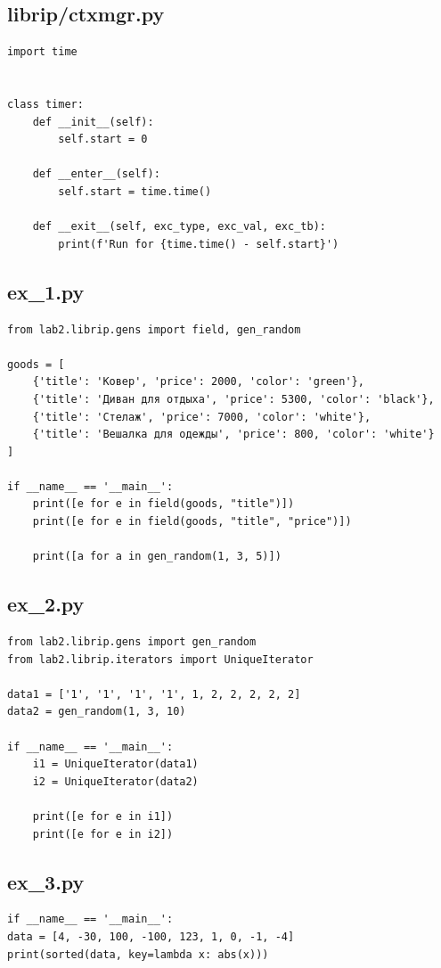 \documentclass{article}
\begin{document}
\subsection{librip/ctxmgr.py}
\begin{verbatim}
import time


class timer:
    def __init__(self):
        self.start = 0

    def __enter__(self):
        self.start = time.time()

    def __exit__(self, exc_type, exc_val, exc_tb):
        print(f'Run for {time.time() - self.start}')
\end{verbatim}

\subsection{ex\_1.py}
\begin{verbatim}
from lab2.librip.gens import field, gen_random

goods = [
    {'title': 'Ковер', 'price': 2000, 'color': 'green'},
    {'title': 'Диван для отдыха', 'price': 5300, 'color': 'black'},
    {'title': 'Стелаж', 'price': 7000, 'color': 'white'},
    {'title': 'Вешалка для одежды', 'price': 800, 'color': 'white'}
]

if __name__ == '__main__':
    print([e for e in field(goods, "title")])
    print([e for e in field(goods, "title", "price")])

    print([a for a in gen_random(1, 3, 5)])

\end{verbatim}
\subsection{ex\_2.py}
\begin{verbatim}
from lab2.librip.gens import gen_random
from lab2.librip.iterators import UniqueIterator
    
data1 = ['1', '1', '1', '1', 1, 2, 2, 2, 2, 2]
data2 = gen_random(1, 3, 10)
    
if __name__ == '__main__':
    i1 = UniqueIterator(data1)
    i2 = UniqueIterator(data2)
    
    print([e for e in i1])
    print([e for e in i2])
\end{verbatim}
\subsection{ex\_3.py}
\begin{verbatim}
if __name__ == '__main__':
data = [4, -30, 100, -100, 123, 1, 0, -1, -4]
print(sorted(data, key=lambda x: abs(x)))
\end{verbatim}
\end{document}
